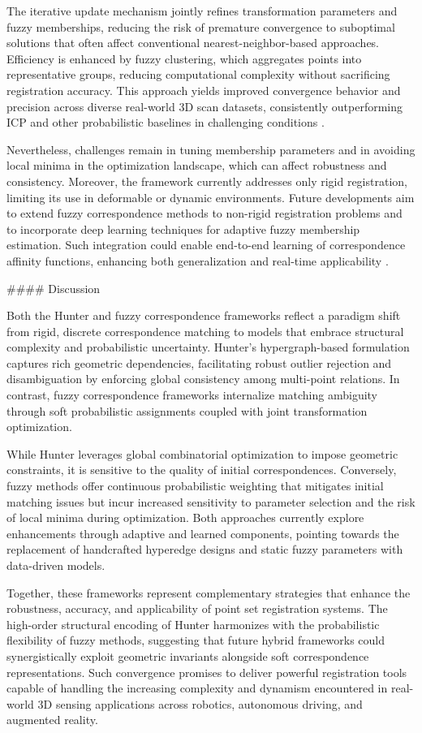 \documentclass[11pt]{article}
\begin{document}
The iterative update mechanism jointly refines transformation parameters and fuzzy memberships, reducing the risk of premature convergence to suboptimal solutions that often affect conventional nearest-neighbor-based approaches. Efficiency is enhanced by fuzzy clustering, which aggregates points into representative groups, reducing computational complexity without sacrificing registration accuracy. This approach yields improved convergence behavior and precision across diverse real-world 3D scan datasets, consistently outperforming ICP and other probabilistic baselines in challenging conditions \cite{ref5}.

Nevertheless, challenges remain in tuning membership parameters and in avoiding local minima in the optimization landscape, which can affect robustness and consistency. Moreover, the framework currently addresses only rigid registration, limiting its use in deformable or dynamic environments. Future developments aim to extend fuzzy correspondence methods to non-rigid registration problems and to incorporate deep learning techniques for adaptive fuzzy membership estimation. Such integration could enable end-to-end learning of correspondence affinity functions, enhancing both generalization and real-time applicability \cite{ref5}.

#### Discussion

Both the Hunter and fuzzy correspondence frameworks reflect a paradigm shift from rigid, discrete correspondence matching to models that embrace structural complexity and probabilistic uncertainty. Hunter’s hypergraph-based formulation captures rich geometric dependencies, facilitating robust outlier rejection and disambiguation by enforcing global consistency among multi-point relations. In contrast, fuzzy correspondence frameworks internalize matching ambiguity through soft probabilistic assignments coupled with joint transformation optimization.

While Hunter leverages global combinatorial optimization to impose geometric constraints, it is sensitive to the quality of initial correspondences. Conversely, fuzzy methods offer continuous probabilistic weighting that mitigates initial matching issues but incur increased sensitivity to parameter selection and the risk of local minima during optimization. Both approaches currently explore enhancements through adaptive and learned components, pointing towards the replacement of handcrafted hyperedge designs and static fuzzy parameters with data-driven models.

Together, these frameworks represent complementary strategies that enhance the robustness, accuracy, and applicability of point set registration systems. The high-order structural encoding of Hunter harmonizes with the probabilistic flexibility of fuzzy methods, suggesting that future hybrid frameworks could synergistically exploit geometric invariants alongside soft correspondence representations. Such convergence promises to deliver powerful registration tools capable of handling the increasing complexity and dynamism encountered in real-world 3D sensing applications across robotics, autonomous driving, and augmented reality.
\end{document}
